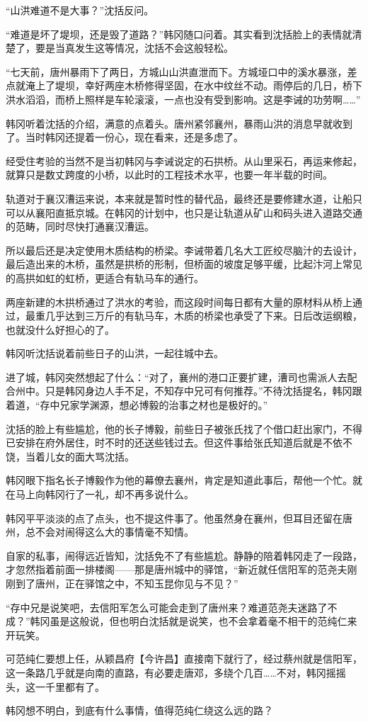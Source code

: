 “山洪难道不是大事？”沈括反问。

“难道是坏了堤坝，还是毁了道路？”韩冈随口问着。其实看到沈括脸上的表情就清楚了，要是当真发生这等情况，沈括不会这般轻松。

“七天前，唐州暴雨下了两日，方城山山洪直泄而下。方城垭口中的溪水暴涨，差点就淹上了堤坝，幸好两座木桥修得坚固，在水中纹丝不动。雨停后的几日，桥下洪水滔滔，而桥上照样是车轮滚滚，一点也没有受到影响。这是李诫的功劳啊……”

韩冈听着沈括的介绍，满意的点着头。唐州紧邻襄州，暴雨山洪的消息早就收到了。当时韩冈还提着一份心，现在看来，还是多虑了。

经受住考验的当然不是当初韩冈与李诫说定的石拱桥。从山里采石，再运来修起，就算只是数丈跨度的小桥，以此时的工程技术水平，也要一年半载的时间。

轨道对于襄汉漕运来说，本来就是暂时性的替代品，最终还是要修建水道，让船只可以从襄阳直抵京城。在韩冈的计划中，也只是让轨道从矿山和码头进入道路交通的范畴，同时尽快打通襄汉漕运。

所以最后还是决定使用木质结构的桥梁。李诫带着几名大工匠绞尽脑汁的去设计，最后造出来的木桥，虽然是拱桥的形制，但桥面的坡度足够平缓，比起汴河上常见的高拱如虹的虹桥，更适合有轨马车的通行。

两座新建的木拱桥通过了洪水的考验，而这段时间每日都有大量的原材料从桥上通过，最重几乎达到三万斤的有轨马车，木质的桥梁也承受了下来。日后改运纲粮，也就没什么好担心的了。

韩冈听沈括说着前些日子的山洪，一起往城中去。

进了城，韩冈突然想起了什么：“对了，襄州的港口正要扩建，漕司也需派人去配合州中。只是韩冈身边人手不足，不知存中兄可有何推荐。”不待沈括提名，韩冈跟着道，“存中兄家学渊源，想必博毅的治事之材也是极好的。”

沈括的脸上有些尴尬，他的长子博毅，前些日子被张氏找了个借口赶出家门，不得已安排在府外居住，时不时的还送些钱过去。但这件事给张氏知道后就是不依不饶，当着儿女的面大骂沈括。

韩冈眼下指名长子博毅作为他的幕僚去襄州，肯定是知道此事后，帮他一个忙。就在马上向韩冈行了一礼，却不再多说什么。

韩冈平平淡淡的点了点头，也不提这件事了。他虽然身在襄州，但耳目还留在唐州，总不会对闹得这么大的事情毫不知情。

自家的私事，闹得远近皆知，沈括免不了有些尴尬。静静的陪着韩冈走了一段路，才忽然指着前面一排楼阁——那是唐州城中的驿馆，“新近就任信阳军的范尧夫刚刚到了唐州，正在驿馆之中，不知玉昆你见与不见？”

“存中兄是说笑吧，去信阳军怎么可能会走到了唐州来？难道范尧夫迷路了不成？”韩冈虽是这般说，但也明白沈括就是说笑，也不会拿着毫不相干的范纯仁来开玩笑。

可范纯仁要想上任，从颖昌府【今许昌】直接南下就行了，经过蔡州就是信阳军，这一条路几乎就是向南的直路，有必要走唐邓，多绕个几百……不对，韩冈摇摇头，这一千里都有了。

韩冈想不明白，到底有什么事情，值得范纯仁绕这么远的路？

